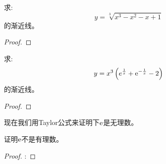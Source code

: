 \begin{example}
    求:
    \begin{equation*}
        y = \sqrt[3]{x^3-x^2-x+1}
    \end{equation*}
    的渐近线。
\end{example}
\begin{proof}
    
\end{proof}

\begin{example}
    求:
    \begin{equation*}
        y = x^3\left(e^\frac{1}{x}+\mathrm{e}^{-\frac{1}{x}}-2\right)
    \end{equation*}
    的渐近线。
\end{example}
\begin{proof}
    
\end{proof}

现在我们用Taylor公式来证明下$\mathrm{e}$是无理数。
\begin{example}
    证明$\mathrm{e}$不是有理数。
\end{example}
\begin{proof}
    :
\end{proof}
